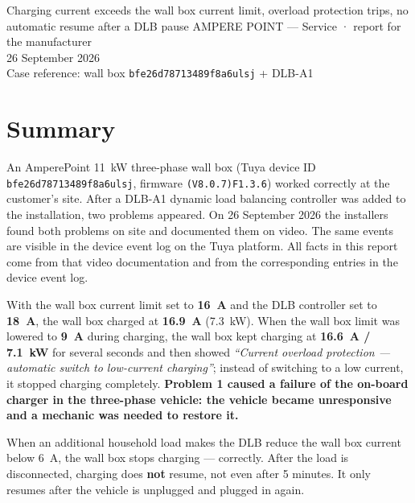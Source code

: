 \documentclass[11pt,a4paper]{article}
\begin{document}
%
{Charging current exceeds the wall box current limit, overload protection trips, no automatic resume after a DLB pause}%
{AMPERE POINT — Service · report for the manufacturer\\26 September 2026\\Case reference: wall box \texttt{bfe26d78713489f8a6ulsj} + DLB-A1}

\section{Summary}

An AmperePoint 11~kW three-phase wall box (Tuya device ID \texttt{bfe26d78713489f8a6ulsj}, firmware \texttt{(V8.0.7)F1.3.6}) worked correctly at the customer's site. After a DLB-A1 dynamic load balancing controller was added to the installation, two problems appeared. On 26 September 2026 the installers found both problems on site and documented them on video. The same events are visible in the device event log on the Tuya platform. All facts in this report come from that video documentation and from the corresponding entries in the device event log.

\begin{apredb}
With the wall box current limit set to \textbf{16~A} and the DLB controller set to \textbf{18~A}, the wall box charged at \textbf{16.9~A} (7.3~kW). When the wall box limit was lowered to \textbf{9~A} during charging, the wall box kept charging at \textbf{16.6~A / 7.1~kW} for several seconds and then showed \emph{``Current overload protection — automatic switch to low-current charging''}; instead of switching to a low current, it stopped charging completely. \textbf{Problem 1 caused a failure of the on-board charger in the three-phase vehicle: the vehicle became unresponsive and a mechanic was needed to restore it.}
\end{apredb}

\begin{apwarnb}
When an additional household load makes the DLB reduce the wall box current below 6~A, the wall box stops charging — correctly. After the load is disconnected, charging does \textbf{not} resume, not even after 5 minutes. It only resumes after the vehicle is unplugged and plugged in again.
\end{apwarnb}
\end{document}
